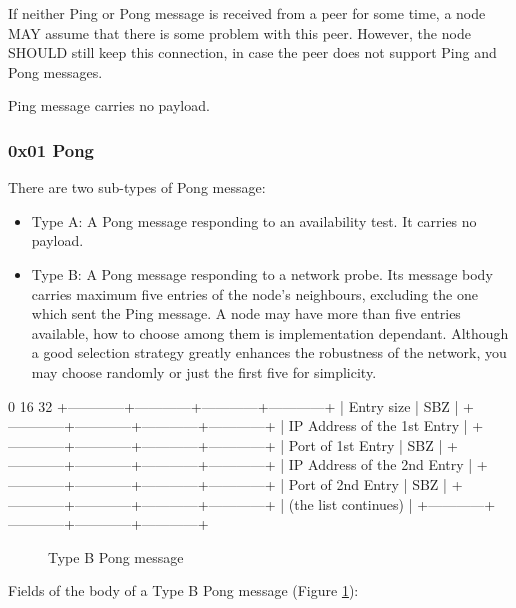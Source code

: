 \documentclass[12pt, a4paper]{article}
\begin{document}
If neither Ping or Pong message is received from a peer for some time, a node MAY assume that there is some problem with this peer.
However, the node SHOULD still keep this connection, in case the peer does not support Ping and Pong messages.

Ping message carries no payload.

\subsubsection{0x01 Pong}
There are two sub-types of Pong message:

\begin{itemize}
\item Type A: A Pong message responding to an availability test.
It carries no payload.
\item Type B: A Pong message responding to a network probe.
Its message body carries maximum five entries of the node's neighbours, excluding the one which sent the Ping message.
A node may have more than five entries available, how to choose among them is implementation dependant.
Although a good selection strategy greatly enhances the robustness of the network, you may choose randomly or just the first five for simplicity.
\end{itemize}

\begin{verbbox}
0                         16                        32
+------------+------------+------------+------------+
|        Entry size       |           SBZ           |
+------------+------------+------------+------------+
|               IP Address of the 1st Entry         |
+------------+------------+------------+------------+
|   Port of 1st Entry     |    	      SBZ           |
+------------+------------+------------+------------+
|               IP Address of the 2nd Entry         |
+------------+------------+------------+------------+
|   Port of 2nd Entry     |    	      SBZ           |
+------------+------------+------------+------------+
|   (the list continues)                            |
+------------+------------+------------+------------+
\end{verbbox}

\begin{figure}[h!]
  \centering
  \theverbbox
  \caption{Type B Pong message}
  \label{bpong}
\end{figure}

Fields of the body of a Type B Pong message (Figure \ref{bpong}):
\end{document}
